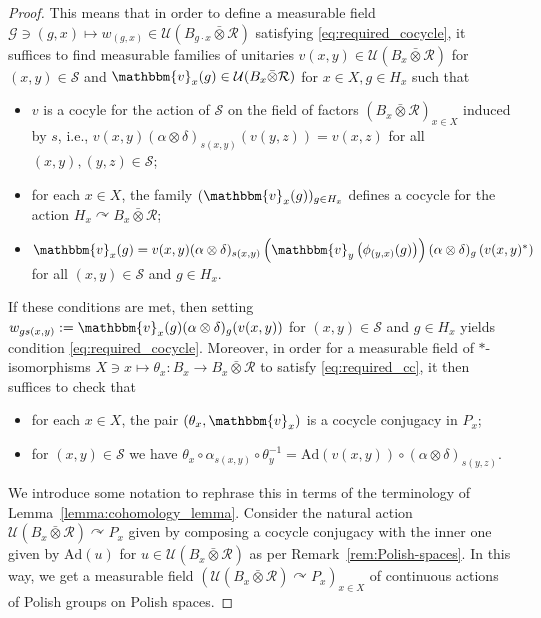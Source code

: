 \documentclass[11pt,a4paper]{article}
\theoremstyle{definition}
\theoremstyle{remark}
\numberwithin{equation}{section}
\numberwithin{theorem}{section}
\newcommand{\acts}{\curvearrowright}
\begin{document}
\begin{proof}
This means that in order to define a measurable field $\mathcal{G} \ni (g,x) \mapsto w_{(g,x)} \in \mathcal{U}(B_{g \cdot x} \bar{\otimes} \mathcal{R})$ satisfying \eqref{eq:required_cocycle}, it suffices to find measurable families of unitaries 
${v{(x,y)} \in \mathcal{U}(B_x \bar{\otimes} \mathcal{R})}$ for $(x,y) \in \mathcal{S}$ and 
$\mathbbm{v}_x(g) \in \mathcal{U}(B_x \bar{\otimes} \mathcal{R})$ for $x \in X, g \in H_x$ such that
\begin{itemize}
\item $v$ is a cocyle for the action of $\mathcal{S}$ on the field of factors $(B_x\bar{\otimes} \mathcal{R})_{x \in X}$ induced by $s$, i.e.,
$v{(x,y)} (\alpha \otimes \delta)_{s(x,y)}(v{(y,z)})=v(x,z)$ for all $(x,y), (y,z) \in \mathcal{S}$;
\item for each $x \in X$, the family $(\mathbbm{v}_x(g))_{g \in H_x}$ defines a cocycle for the action $H_x \acts B_x \bar{\otimes} \mathcal{R}$;
\item $\mathbbm{v}_x(g) = v{(x,y)} (\alpha \otimes \delta)_{s(x,y)}\left(\mathbbm{v}_y\left({\phi_{(y,x)}(g)}\right)\right) (\alpha \otimes \delta)_g\left(v(x,y)^*\right) $ for all $(x,y) \in \mathcal{S}$ and $g \in H_x$. 
\end{itemize}
If these conditions are met, then setting $w_{g s(x,y)} := \mathbbm{v}_x(g)(\alpha \otimes \delta)_g (v(x,y))$ for $(x,y) \in \mathcal{S}$ and $g \in H_x$ yields condition \eqref{eq:required_cocycle}.
%
Moreover, in order for a measurable field of $*$-isomorphisms ${X \ni x \mapsto \theta_x \colon B_x \rightarrow B_x \bar{\otimes} \mathcal{R}}$ to satisfy \eqref{eq:required_cc}, it then suffices to check that 
\begin{itemize}
\item for each $x \in X$, the pair $(\theta_x, \mathbbm{v}_x)$ is a cocycle conjugacy in $P_x$;
\item for $(x,y) \in \mathcal{S}$ we have $\theta_x \circ \alpha_{s(x,y)} \circ \theta_y^{-1} = \mathrm{Ad}(v(x,y))\circ (\alpha \otimes \delta)_{s(y,z)}$.
\end{itemize}
%
We introduce some notation to rephrase this in terms of the terminology of Lemma~\ref{lemma:cohomology_lemma}. Consider the natural action $\mathcal{U}(B_x \bar{\otimes} \mathcal{R}) \acts P_x$ given by composing a cocycle conjugacy with the inner one given by $\mathrm{Ad}(u)$ for $u \in \mathcal{U}(B_x \bar{\otimes} \mathcal{R})$ as per Remark~\ref{rem:Polish-spaces}.
In this way, we get a measurable field $(\mathcal{U}(B_x \bar{\otimes} \mathcal{R}) \acts P_x)_{x \in X}$ of continuous actions of Polish groups on Polish spaces.

\end{proof}
\end{document}
